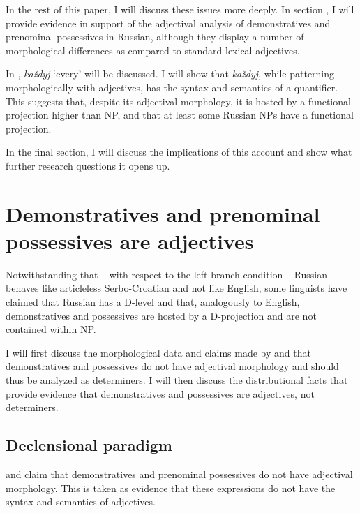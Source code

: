 \documentclass[output=paper]{langscibook}
\begin{document}
In the rest of this paper, I will discuss these issues more deeply. In section , I will provide evidence in support of the adjectival analysis of demonstratives and prenominal possessives in Russian, %
although they display a number of morphological differences as compared to standard lexical adjectives.

In , \textit{každyj} `every' will be discussed. I will show that \textit{každyj}, %
while patterning morphologically with adjectives, has the syntax and semantics of a quantifier. This suggests that, despite its adjectival morphology, it is hosted by a functional projection higher than NP, and that at least some Russian NPs have a functional projection.

In the final section, I will discuss the implications of this account and show what further research questions it opens up.   
%
%
\section{Demonstratives and prenominal possessives are adjectives}\label{adjectives}

Notwithstanding that -- with respect to the left branch condition -- Russian behaves like articleless Serbo-Croatian and not like English, some linguists have claimed that Russian has a D-level and that, analogously to English, demonstratives and possessives are hosted by a D-projection and are not contained within NP. 

I will first discuss the morphological data and claims made by \citet{Babyonyshev1997} and \citet{Pereltsvaig2007} that demonstratives and possessives do not have adjectival morphology and should thus be analyzed as determiners. I will then discuss the distributional facts that provide evidence that demonstratives and possessives are adjectives, not determiners.  

\subsection{Declensional paradigm}

\citet{Babyonyshev1997} and \citet{Pereltsvaig2007} claim that demonstratives and pre\-nominal possessives do not have adjectival morphology. This is taken as evidence that these expressions do not have the syntax and semantics of adjectives.  
\end{document}
